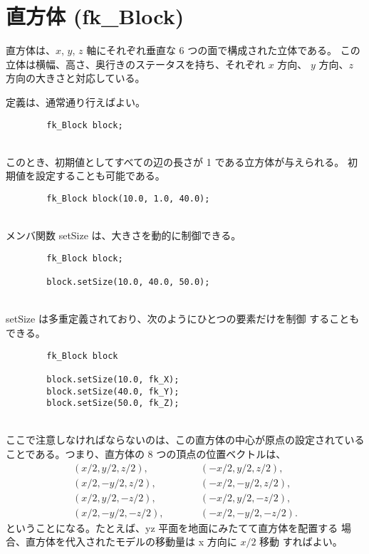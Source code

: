\section{直方体 (fk\_Block)}
直方体は、\(x\), \(y\), \(z\) 軸にそれぞれ垂直な
6 つの面で構成された立体である。
この立体は横幅、高さ、奥行きのステータスを持ち、それぞれ \(x\) 方向、
\(y\) 方向、\(z\) 方向の大きさと対応している。

定義は、通常通り行えばよい。
\\
\begin{screen}
\begin{verbatim}
        fk_Block block;
\end{verbatim}
\end{screen}
~ \\
このとき、初期値としてすべての辺の長さが 1 である立方体が与えられる。
初期値を設定することも可能である。
\\
\begin{screen}
\begin{verbatim}
        fk_Block block(10.0, 1.0, 40.0);
\end{verbatim}
\end{screen}
~ \\
メンバ関数 setSize は、大きさを動的に制御できる。
\\
\begin{screen}
\begin{verbatim}
        fk_Block block;

        block.setSize(10.0, 40.0, 50.0);
\end{verbatim}
\end{screen}
~ \\
setSize は多重定義されており、次のようにひとつの要素だけを制御
することもできる。
\\
\begin{breakbox}
\begin{verbatim}
        fk_Block block

        block.setSize(10.0, fk_X);
        block.setSize(40.0, fk_Y);
        block.setSize(50.0, fk_Z);
\end{verbatim}
\end{breakbox}
~ \\
ここで注意しなければならないのは、この直方体の中心が原点の設定されている
ことである。つまり、直方体の 8 つの頂点の位置ベクトルは、
\begin{eqnarray*}
        (x/2, y/2, z/2), & \qquad & (-x/2, y/2, z/2), \\
        (x/2, -y/2, z/2), & \qquad & (-x/2, -y/2, z/2), \\
        (x/2, y/2, -z/2), & \qquad & (-x/2, y/2, -z/2), \\
        (x/2, -y/2, -z/2), & \qquad & (-x/2, -y/2, -z/2).
\end{eqnarray*}
ということになる。たとえば、yz 平面を地面にみたてて直方体を配置する
場合、直方体を代入されたモデルの移動量は x 方向に \(x/2\) 移動
すればよい。

